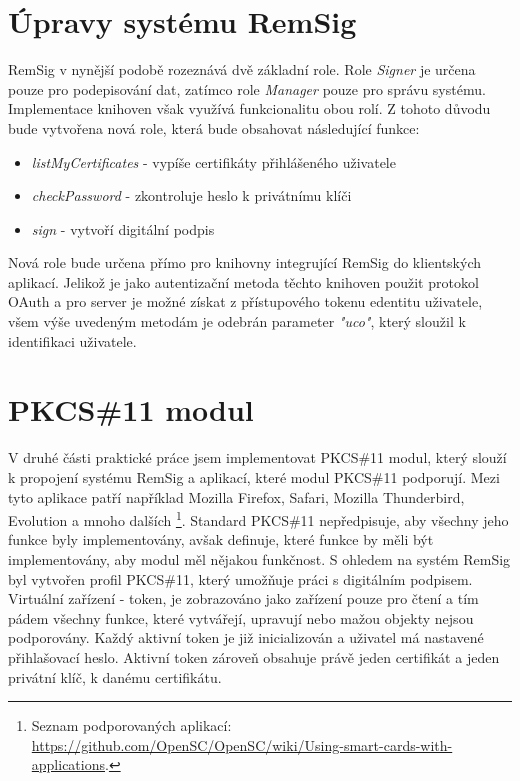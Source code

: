 \documentclass[]{fithesis3}
\begin{document}
	\section{Úpravy systému RemSig}

	RemSig v nynější podobě rozeznává dvě základní role. Role \textit{Signer} je určena pouze pro 		podepisování dat, zatímco role \textit{Manager} pouze pro správu systému. Implementace 			knihoven však využívá funkcionalitu obou rolí. Z tohoto důvodu bude vytvořena nová role, 			která bude obsahovat následující funkce:
	\begin{itemize}
		\item \textit{listMyCertificates} - vypíše certifikáty přihlášeného uživatele

		\item \textit{checkPassword} - zkontroluje heslo k privátnímu klíči

		\item \textit{sign} - vytvoří digitální podpis
	\end{itemize}

	Nová role bude určena přímo pro knihovny integrující RemSig do klientských aplikací. Jelikož 		je jako autentizační metoda těchto knihoven použit protokol OAuth a pro server je možné 			získat z přístupového tokenu edentitu uživatele, všem výše uvedeným metodám je odebrán 		parameter \textit{"uco"}, který sloužil k identifikaci uživatele.

	\section{PKCS\#11 modul}
	
	V druhé části praktické práce jsem implementovat PKCS\#11 modul, který slouží k propojení 		systému RemSig a aplikací, které modul PKCS\#11 podporují. Mezi tyto aplikace patří například 	Mozilla Firefox, Safari, Mozilla Thunderbird, Evolution a mnoho dalších
\footnote{Seznam podporovaných aplikací: \url{https://github.com/OpenSC/OpenSC/wiki/Using-smart-cards-with-applications}.}. 
	Standard PKCS\#11 nepředpisuje, aby všechny jeho funkce byly implementovány, avšak 			definuje, které funkce by měli být implementovány, aby modul měl nějakou funkčnost. S ohledem 	na systém RemSig byl vytvořen profil PKCS\#11, který umožňuje práci s digitálním podpisem. 		Virtuální zařízení - token, je zobrazováno jako zařízení pouze pro čtení a tím pádem všechny 		funkce, které vytvářejí, upravují nebo mažou objekty nejsou podporovány. Každý aktivní token je 	již inicializován a uživatel má nastavené přihlašovací heslo. Aktivní token zároveň obsahuje 			právě jeden certifikát a jeden privátní klíč, k danému certifikátu.
\end{document}
